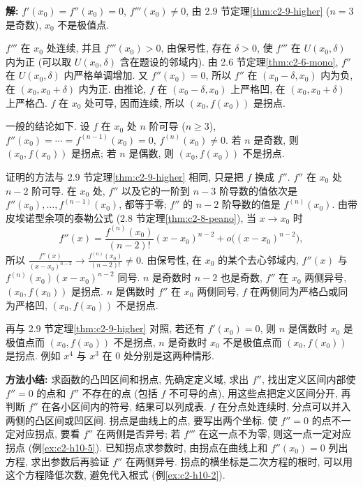 \documentclass[UTF8,openany]{ctexbook}
\theoremstyle{chinesetextbook}
\newenvironment{cnsolution}{\par\indent\textbf{解:} \ignorespaces}{\par}
\begin{document}
\begin{cnsolution}
$f'(x_0)=f''(x_0)=0$, $f'''(x_0)\ne0$, 由 2.9 节定理\ref{thm:c2-9-higher} ($n=3$ 是奇数), $x_0$ 不是极值点.

$f'''$ 在 $x_0$ 处连续, 并且 $f'''(x_0)>0$, 由保号性, 存在 $\delta>0$, 使 $f'''$ 在 $U(x_0,\delta)$ 内为正 (可以取 $U(x_0,\delta)$ 含在题设的邻域内). 由 2.6 节定理\ref{thm:c2-6-mono}, $f''$ 在 $U(x_0,\delta)$ 内严格单调增加. 又 $f''(x_0)=0$, 所以 $f''$ 在 $(x_0-\delta,x_0)$ 内为负, 在 $(x_0,x_0+\delta)$ 内为正. 由推论, $f$ 在 $(x_0-\delta,x_0)$ 上严格凹, 在 $(x_0,x_0+\delta)$ 上严格凸. $f$ 在 $x_0$ 处可导, 因而连续, 所以 $(x_0,f(x_0))$ 是拐点.

一般的结论如下. 设 $f$ 在 $x_0$ 处 $n$ 阶可导 ($n\ge3$), $f''(x_0)=\cdots=f^{(n-1)}(x_0)=0$, $f^{(n)}(x_0)\ne0$. 若 $n$ 是奇数, 则 $(x_0,f(x_0))$ 是拐点; 若 $n$ 是偶数, 则 $(x_0,f(x_0))$ 不是拐点.

证明的方法与 2.9 节定理\ref{thm:c2-9-higher} 相同, 只是把 $f$ 换成 $f''$. $f''$ 在 $x_0$ 处 $n-2$ 阶可导. 在 $x_0$ 处, $f''$ 以及它的一阶到 $n-3$ 阶导数的值依次是 $f''(x_0),\ldots,f^{(n-1)}(x_0)$, 都等于零; $f''$ 的 $n-2$ 阶导数的值是 $f^{(n)}(x_0)$. 由带皮埃诺型余项的泰勒公式 (2.8 节定理\ref{thm:c2-8-peano}), 当 $x\to x_0$ 时
\[
f''(x)=\frac{f^{(n)}(x_0)}{(n-2)!}(x-x_0)^{n-2}+o\bigl((x-x_0)^{n-2}\bigr),
\]
所以 $\displaystyle\frac{f''(x)}{(x-x_0)^{n-2}}\to\frac{f^{(n)}(x_0)}{(n-2)!}\ne0$. 由保号性, 在 $x_0$ 的某个去心邻域内, $f''(x)$ 与 $f^{(n)}(x_0)(x-x_0)^{n-2}$ 同号. $n$ 是奇数时 $n-2$ 也是奇数, $f''$ 在 $x_0$ 两侧异号, $(x_0,f(x_0))$ 是拐点. $n$ 是偶数时 $f''$ 在 $x_0$ 两侧同号, $f$ 在两侧同为严格凸或同为严格凹, $(x_0,f(x_0))$ 不是拐点.

再与 2.9 节定理\ref{thm:c2-9-higher} 对照, 若还有 $f'(x_0)=0$, 则 $n$ 是偶数时 $x_0$ 是极值点而 $(x_0,f(x_0))$ 不是拐点, $n$ 是奇数时 $x_0$ 不是极值点而 $(x_0,f(x_0))$ 是拐点. 例如 $x^4$ 与 $x^3$ 在 $0$ 处分别是这两种情形.
\end{cnsolution}
\par\indent\textbf{方法小结:} 求函数的凸凹区间和拐点, 先确定定义域, 求出 $f''$, 找出定义区间内部使 $f''=0$ 的点和 $f''$ 不存在的点 (包括 $f$ 不可导的点), 用这些点把定义区间分开, 再判断 $f''$ 在各小区间内的符号, 结果可以列成表. $f$ 在分点处连续时, 分点可以并入两侧的凸区间或凹区间. 拐点是曲线上的点, 要写出两个坐标. 使 $f''=0$ 的点不一定对应拐点, 要看 $f''$ 在两侧是否异号; 若 $f'''$ 在这一点不为零, 则这一点一定对应拐点 (例\ref{ex:c2-h10-5}). 已知拐点求参数时, 由拐点在曲线上和 $f''(x_0)=0$ 列出方程, 求出参数后再验证 $f''$ 在两侧异号. 拐点的横坐标是二次方程的根时, 可以用这个方程降低次数, 避免代入根式 (例\ref{ex:c2-h10-2}).
\end{document}
